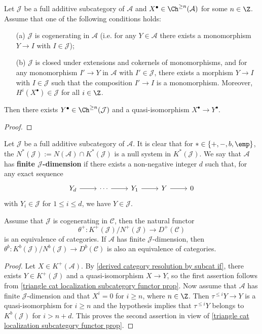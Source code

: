 \begin{lemma}\label{derived category resolution by subcat if}
Let $\mathcal{J}$ be a full additive subcategory of $\mathcal{A}$ and $X^\bullet\in \Ch^{\geq n}(\mathcal{A})$ for some $n\in\Z$. Assume that one of the following conditions holds:
\begin{enumerate}
    \item[(a)] $\mathcal{J}$ is cogenerating in $\mathcal{A}$ (i.e. for any $Y\in\mathcal{A}$ there exists a monomorphism $Y\to I$ with $I\in\mathcal{J}$);
    \item[(b)] $\mathcal{J}$ is closed under extensions and cokernels of monomorphisms, and for any monomorphism $I'\to Y$ in $\mathcal{A}$ with $I'\in\mathcal{J}$, there exists a morphism $Y\to I$ with $I\in\mathcal{J}$ such that the composition $I'\to I$ is a monomorphism. Moreover, $H^i(X^\bullet)\in\mathcal{J}$ for all $i\in\Z$.
\end{enumerate}
Then there exists $Y^\bullet\in\Ch^{\geq n}(\mathcal{J})$ and a quasi-isomorphism $X^\bullet\to Y^\bullet$.
\end{lemma}
\begin{proof}

\end{proof}

Let $\mathcal{J}$ be a full additive subcategory of $\mathcal{A}$. It is clear that for $*\in\{+,-,b,\emp\}$, the $N^*(\mathcal{J}):=N(\mathcal{A})\cap K^*(\mathcal{J})$ is a null system in $K^*(\mathcal{J})$. We say that $\mathcal{A}$ has \textbf{finite $\mathcal{J}$-dimension} if there exists a non-negative integer $d$ such that, for any exact sequence
\[\begin{tikzcd}
Y_d\ar[r]&\cdots\ar[r]&Y_1\ar[r]&Y\ar[r]&0
\end{tikzcd}\]
with $Y_i\in\mathcal{J}$ for $1\leq i\leq d$, we have $Y\in\mathcal{J}$.

\begin{proposition}\label{derived category resolution of cogenerating prop}
Assume that $\mathcal{J}$ is cogenerating in $\mathcal{C}$, then the natural functor
\[\theta^+:K^+(\mathcal{J})/N^+(\mathcal{J})\to D^+(\mathcal{C})\]
is an equivalence of categories. If $\mathcal{A}$ has finite $\mathcal{J}$-dimension, then $\theta^b:K^b(\mathcal{J})/N^b(\mathcal{J})\to D^b(\mathcal{C})$ is also an equivalence of categories.
\end{proposition}
\begin{proof}
Let $X\in K^+(\mathcal{A})$. By \cref{derived category resolution by subcat if}, there exists $Y\in K^+(\mathcal{J})$ and a quasi-isomorphism $X\to Y$, so the first assertion follows from \cref{triangle cat localization subcategory functor prop}. Now assume that $\mathcal{A}$ has finite $\mathcal{J}$-dimension and that $X^i=0$ for $i\geq n$, where $n\in\Z$. Then $\tau^{\leq i}Y\to Y$ is a quasi-isomorphism for $i\geq n$ and the hypothesis implies that $\tau^{\leq i}Y$ belongs to $K^b(\mathcal{J})$ for $i>n+d$. This proves the second assertion in view of \cref{triangle cat localization subcategory functor prop}.
\end{proof}

